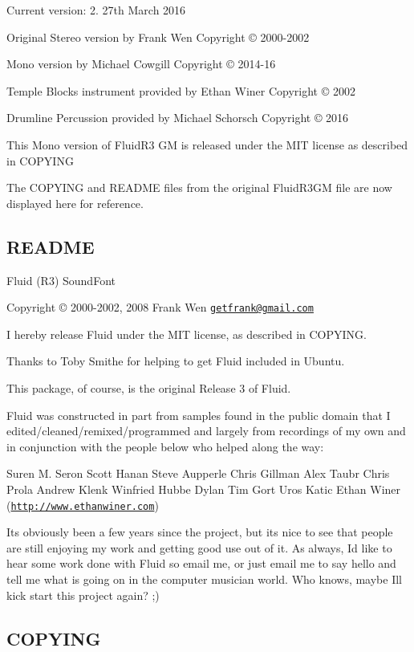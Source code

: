 Current version\+: 2. 27th March 2016

Original Stereo version by Frank Wen Copyright © 2000-\/2002

Mono version by Michael Cowgill Copyright © 2014-\/16

Temple Blocks instrument provided by Ethan Winer Copyright © 2002

Drumline Percussion provided by Michael Schorsch Copyright © 2016

This Mono version of Fluid\+R3 GM is released under the M\+IT license as described in C\+O\+P\+Y\+I\+NG

The C\+O\+P\+Y\+I\+NG and R\+E\+A\+D\+ME files from the original Fluid\+R3\+GM file are now displayed here for reference.

\subsection*{R\+E\+A\+D\+ME }

Fluid (R3) Sound\+Font

Copyright © 2000-\/2002, 2008 Frank Wen \href{mailto:getfrank@gmail.com}{\tt getfrank@gmail.\+com}

I hereby release Fluid under the M\+IT license, as described in C\+O\+P\+Y\+I\+NG.

Thanks to Toby Smithe for helping to get Fluid included in Ubuntu.

This package, of course, is the original Release 3 of Fluid.

Fluid was constructed in part from samples found in the public domain that I edited/cleaned/remixed/programmed and largely from recordings of my own and in conjunction with the people below who helped along the way\+:

Suren M. Seron Scott Hanan Steve Aupperle Chris Gillman Alex Taubr Chris Prola Andrew Klenk Winfried Hubbe Dylan Tim Gort Uros Katic Ethan Winer (\href{http://www.ethanwiner.com}{\tt http\+://www.\+ethanwiner.\+com})

It\textquotesingle{}s obviously been a few years since the project, but its nice to see that people are still enjoying my work and getting good use out of it. As always, I\textquotesingle{}d like to hear some work done with Fluid so email me, or just email me to say hello and tell me what is going on in the computer musician world. Who knows, maybe I\textquotesingle{}ll kick start this project again? ;)

\subsection*{C\+O\+P\+Y\+I\+NG }

